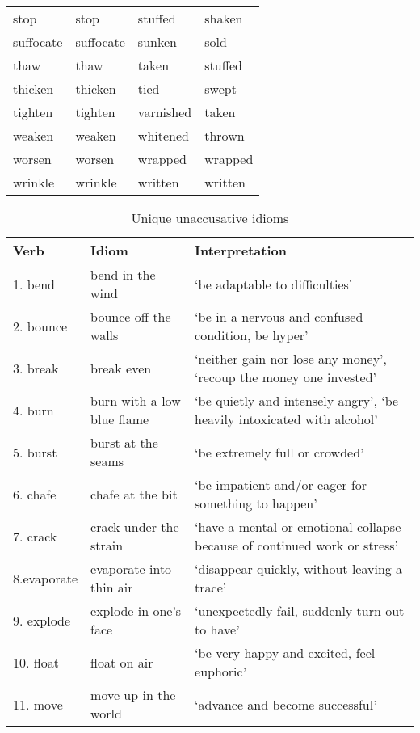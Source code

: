 \documentclass[output=paper]{langsci/langscibook}
\begin{document}
\begin{paperappendix}
{\begin{longtable}{ *{4}{>{\raggedright\arraybackslash}p{}} }
stop      & stop      & stuffed   & shaken\\
suffocate & suffocate & sunken    & sold\\
thaw      & thaw      & taken     & stuffed\\
thicken   & thicken   & tied      & swept\\
tighten   & tighten   & varnished & taken\\
weaken    & weaken    & whitened  & thrown\\
worsen    & worsen    & wrapped   & wrapped\\
wrinkle   & wrinkle   & written   & written\\
\end{longtable}}
\largerpage
\begin{table}[H]
\small
\caption{Unique unaccusative idioms}
\begin{tabularx}{\textwidth}{llQ}
\lsptoprule
{Verb} & {Idiom} & {Interpretation} \\
\midrule
{1. bend}  & bend in the wind & ‘be adaptable to difficulties’\\
{2. bounce}  & bounce off the walls & ‘be in a nervous and confused condition, be hyper’\\
{3. break}  & break even & ‘neither gain nor lose any money’, ‘recoup the money one invested’\\
{4. burn}  & burn with a low blue flame & ‘be quietly and intensely angry’, ‘be heavily intoxicated with alcohol’ \\
{5. burst}  & burst at the seams & ‘be extremely full or crowded’  \\
{6. chafe}  & chafe at the bit & ‘be impatient and/or eager for something to happen’\\
{7. crack}  & crack under the strain & ‘have a mental or emotional collapse because of continued work or stress’\\
{8.evaporate} & evaporate into thin air & ‘disappear quickly, without leaving a trace’\\
{9. explode}  & explode in one’s face & ‘unexpectedly fail, suddenly turn out to have’\\
{10. float}  & float on air & ‘be very happy and excited, feel euphoric’\\
{11. move}  & move up in the world & ‘advance and become successful’ \\

\end{tabularx}
\end{table}
\end{paperappendix}
\end{document}

